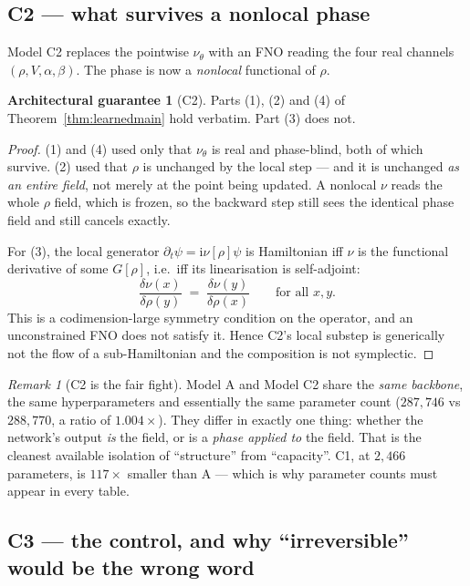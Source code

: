 \documentclass[11pt,a4paper]{article}
\theoremstyle{plain}
\theoremstyle{definition}
\newtheorem{guarantee}[theorem]{Architectural guarantee}
\theoremstyle{remark}
\newtheorem{remark}[theorem]{Remark}
\newcommand{\iu}{\mathrm{i}}
\begin{document}
\subsection{C2 --- what survives a nonlocal phase}
\label{sec:c2}

Model C2 replaces the pointwise $\nu_\theta$ with an FNO reading the four real channels
$(\rho, V, \alpha, \beta)$. The phase is now a \emph{nonlocal} functional of $\rho$.

\begin{guarantee}[C2]
\label{guar:c2}
Parts (1), (2) and (4) of Theorem~\ref{thm:learnedmain} hold verbatim. Part (3) does not.
\end{guarantee}

\begin{proof}
(1) and (4) used only that $\nu_\theta$ is real and phase-blind, both of which survive.
(2) used that $\rho$ is unchanged by the local step --- and it is unchanged
\emph{as an entire field}, not merely at the point being updated. A nonlocal $\nu$ reads
the whole $\rho$ field, which is frozen, so the backward step still sees the identical
phase field and still cancels exactly.

For (3), the local generator $\partial_t\psi = \iu\nu[\rho]\psi$ is Hamiltonian iff
$\nu$ is the functional derivative of some $G[\rho]$, i.e.\ iff its linearisation is
self-adjoint:
\[
\frac{\delta\nu(x)}{\delta\rho(y)} \;=\; \frac{\delta\nu(y)}{\delta\rho(x)}
\qquad\text{for all }x,y .
\]
This is a codimension-large symmetry condition on the operator, and an unconstrained FNO
does not satisfy it. Hence C2's local substep is generically not the flow of a
sub-Hamiltonian and the composition is not symplectic.
\end{proof}

\begin{remark}[C2 is the fair fight]
Model A and Model C2 share the \emph{same backbone}, the same hyperparameters and
essentially the same parameter count ($287{,}746$ vs $288{,}770$, a ratio of
$1.004\times$). They differ in exactly one thing: whether the network's output \emph{is}
the field, or is a \emph{phase applied to} the field. That is the cleanest available
isolation of ``structure'' from ``capacity''. C1, at $2{,}466$ parameters, is $117\times$
smaller than A --- which is why parameter counts must appear in every table.
\end{remark}

\subsection{C3 --- the control, and why ``irreversible'' would be the wrong word}
\label{sec:c3}
\end{document}
